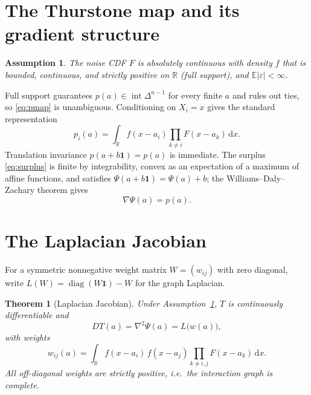 \documentclass[11pt]{article}
\newtheorem{theorem}{Theorem}
\newtheorem{assumption}{Assumption}
\theoremstyle{definition}
\theoremstyle{remark}
\newcommand{\R}{\mathbb{R}}
\newcommand{\one}{\mathbf{1}}
\newcommand{\intsimplex}{\operatorname{int}\Delta^{n-1}}
\newcommand{\dd}{\,\mathrm{d}}
\DeclareMathOperator{\diag}{diag}
\begin{document}
\section{The Thurstone map and its gradient structure}
\label{sec:setup}

\begin{assumption}
\label{ass:noise}
The noise CDF $F$ is absolutely continuous with density $f$ that is bounded,
continuous, and strictly positive on $\R$ (full support), and
$\mathbb{E}|\varepsilon| < \infty$.
\end{assumption}

Full support guarantees $p(a) \in \intsimplex$ for every finite $a$ and rules
out ties, so \eqref{eq:pmap} is unambiguous.  Conditioning on $X_i = x$
gives the standard representation
\begin{equation}
  p_i(a) = \int_{\R} f(x - a_i) \prod_{k \ne i} F(x - a_k) \dd x .
  \label{eq:pint}
\end{equation}
Translation invariance $p(a + b\one) = p(a)$ is immediate.  The surplus
\eqref{eq:surplus} is finite by integrability, convex as an expectation of a
maximum of affine functions, and satisfies $\Psi(a+b\one) = \Psi(a) + b$; the
Williams--Daly--Zachary theorem gives
\begin{equation}
  \nabla \Psi(a) = p(a).
  \label{eq:wdz}
\end{equation}

\section{The Laplacian Jacobian}
\label{sec:laplacian}

For a symmetric nonnegative weight matrix $W = (w_{ij})$ with zero diagonal,
write $L(W) = \diag(W\one) - W$ for the graph Laplacian.

\begin{theorem}[Laplacian Jacobian]
\label{thm:laplacian}
Under Assumption~\ref{ass:noise}, $T$ is continuously differentiable and
\[
  D T(a) = \nabla^2 \Psi(a) = L\bigl(w(a)\bigr),
\]
with weights
\[
  w_{ij}(a) = \int_{\R} f(x-a_i)\, f(x-a_j) \prod_{k \ne i,j} F(x-a_k) \dd x .
\]
All off-diagonal weights are strictly positive, i.e.\ the interaction graph is
complete.
\end{theorem}
\end{document}
